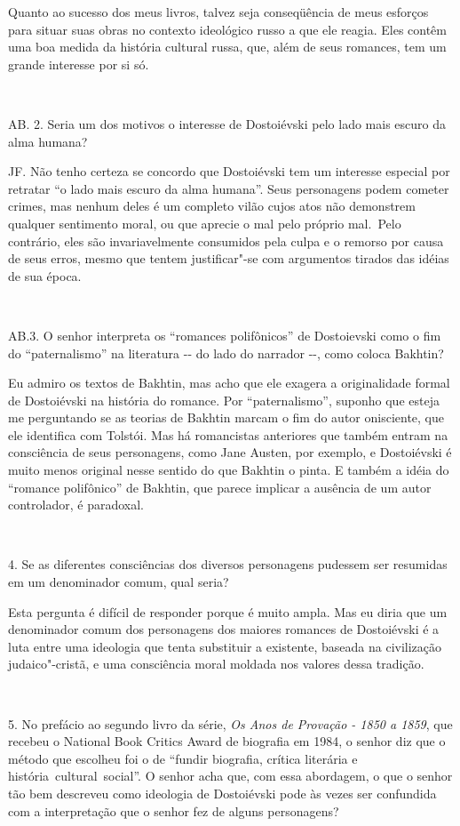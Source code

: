Quanto ao sucesso dos meus livros, talvez seja conseqüência de meus
esforços para situar suas obras no contexto ideológico russo a que ele
reagia. Eles contêm uma boa medida da história cultural russa, que, além
de seus romances, tem um grande interesse por si só.

~

AB. 2. Seria um dos motivos o interesse de Dostoiévski pelo lado mais
escuro da alma humana?

JF. Não tenho certeza se concordo que Dostoiévski tem um interesse
especial por retratar ``o lado mais escuro da alma humana''. Seus
personagens podem cometer crimes, mas nenhum deles é um completo vilão
cujos atos não demonstrem qualquer sentimento moral, ou que aprecie o
mal pelo próprio mal.~Pelo contrário, eles são invariavelmente
consumidos pela culpa e o remorso por causa de seus erros, mesmo que
tentem justificar"-se com argumentos tirados das idéias de sua época.

~

AB.3. O senhor interpreta os ``romances polifônicos'' de Dostoievski como
o fim do ``paternalismo'' na literatura -\/- do lado do narrador -\/-,
como coloca Bakhtin?

Eu admiro os textos de Bakhtin, mas acho que ele exagera a originalidade
formal de Dostoiévski na história do romance. Por ``paternalismo'',
suponho que esteja me perguntando se as teorias de Bakhtin marcam o fim
do autor onisciente, que ele identifica com Tolstói. Mas há romancistas
anteriores que também entram na consciência de seus personagens, como
Jane Austen, por exemplo, e Dostoiévski é muito menos original nesse
sentido do que Bakhtin o pinta. E também a idéia do ``romance polifônico''
de Bakhtin, que parece implicar a ausência de um autor controlador, é
paradoxal.

~

4. Se as diferentes consciências dos diversos personagens pudessem ser
resumidas em um denominador comum, qual seria?

Esta pergunta é difícil de responder porque é muito ampla. Mas eu diria
que um denominador comum dos personagens dos maiores romances de
Dostoiévski é a luta entre uma ideologia que tenta substituir a
existente, baseada na civilização judaico"-cristã, e uma consciência
moral moldada nos valores dessa tradição.

~

5. No prefácio ao segundo livro da série, \emph{Os Anos de Provação - 1850 a
1859}, que recebeu o National Book Critics Award de biografia em 1984, o
senhor diz que o método que escolheu foi o de ``fundir biografia, crítica
literária e história~cultural~social''. O senhor acha que, com essa
abordagem, o que o senhor tão bem descreveu como ideologia de
Dostoiévski pode às vezes ser confundida com a interpretação que o
senhor fez de alguns personagens?

